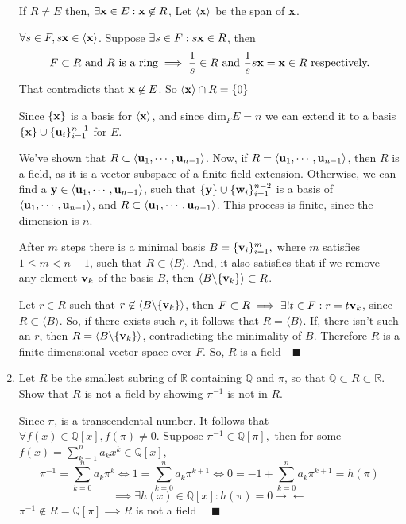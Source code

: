 \documentclass{article}
\newcommand\Q{\mathbb{Q}}
\newcommand\R{\mathbb{R}}
\begin{document}
\begin{enumerate}
   If $R \neq E$ then, $\exists \vb{x}\in E: \vb{x}\not\in R$, Let $\langle \vb{x} \rangle$ be the span of $\vb{x}$.

   $\forall s\in F, s\vb{x}\in \langle \vb{x} \rangle$. Suppose $\exists s\in F: s\vb{x} \in R$, then
   \[F\subset R\text{ and } R\text{ is a ring} \implies \frac{1}{s}
     \in R \text{ and } \frac{1}{s}s\vb{x} = \vb{x}
     \in R \text{ respectively.}\]
   That contradicts that $\vb{x}\not\in E$. So $\langle \vb{x}
   \rangle\cap R = \{0\}$

   Since $\{\vb{x}\}$ is a basis for $\langle \vb{x} \rangle$, and
   since dim$_F E = n$ we can
   extend it to a basis$\{\vb{x}\} \cup \{ \vb{u}_i\}_{i=1}^{n-1}$ for $E$.

   We've shown that $R \subset \langle \vb{u}_1,\cdots, \vb{u}_{n-1}
   \rangle$. Now, if $R = \langle \vb{u}_1,\cdots, \vb{u}_{n-1} \rangle$, then
   $R$ is a field, as it is a vector subspace of a
   finite field extension. Otherwise, we can find a $\vb{y} \in
   \langle \vb{u}_1,\cdots, \vb{u}_{n-1} \rangle$, such that
   $\{\vb{y}\}\cup\{ \vb{w}_i\}_{i=1}^{n-2}$ is a basis of $\langle
   \vb{u}_1,\cdots, \vb{u}_{n-1} \rangle$, and $R\subset
   \langle \vb{u}_1,\cdots, \vb{u}_{n-1} \rangle$. This process is
   finite, since the dimension is $n$.

   After $m$ steps there is a minimal basis $B
   =\{\vb{v}_i\}_{i=1}^m,$ where $m$ satisfies $
   1 \leq m < n-1$, such that
   $R\subset \langle B \rangle$.
   And, it also satisfies that if we remove any element $\vb{v}_k$ of
   the basis $B$, then
  $\langle B\backslash\{\vb{v}_k\} \rangle \subset R$.

   Let $r\in R$ such that $r \not\in \langle B\backslash\{\vb{v}_k\}
   \rangle$, then $F\subset R \implies \exists! t \in F: r =
   t\vb{v}_k$, since $R \subset \langle  B \rangle$. So, if there
   exists such $r$, it follows that $R = \langle B \rangle$. If, there
   isn't such an $r$, then $R = \langle
   B\backslash\{\vb{v}_k\}\rangle$, contradicting the minimality of
   $B$. Therefore $R$ is a finite dimensional vector space over
   $F$. So, $R$ is a field$\quad \blacksquare$

\item Let $R$ be the smallest subring of $\R$ containing $\Q$ and
  $\pi$, so that $\Q \subset R \subset \R$. Show that $R$ is not a
  field by showing $\pi^{-1}$ is not in $R$.

   Since $\pi$, is a
  transcendental number. It follows that $\forall f(x)\in \Q[x],
  f(\pi)\neq 0$. Suppose $\pi^{-1} \in \Q[\pi],$ then for some $f(x) =
  \sum_{k=1}^n a_kx^k \in \Q[x]$,  \[\pi^{-1} = \sum_{k=0}^n
    a_k\pi^k\iff  1 = \sum_{k=0}^{n}
    a_k\pi^{k+1} \iff 0 = -1 +\sum_{k=0}^{n}
    a_k\pi^{k+1} = h(\pi) \]
\[\implies \exists h(x)\in \Q[x]: h(\pi) = 0
    \rightarrow\leftarrow \]
  $\pi^{-1}\not\in R= \Q[\pi] \implies R$ is not a field $\quad \blacksquare$


\end{enumerate}
\end{document}
